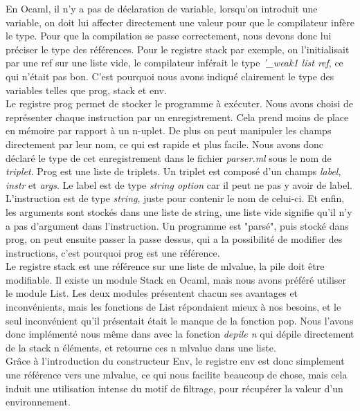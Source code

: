 \documentclass[11pt]{article}
\begin{document}
%

\vspace{0.5cm}

En Ocaml, il n'y a pas de déclaration de variable, lorsqu'on introduit une variable, on doit lui affecter directement une valeur pour que le compilateur infère le type. Pour que la compilation se passe correctement, nous devons donc lui préciser le type des références. Pour le registre stack par exemple, on l'initialisait par une ref sur une liste vide, le compilateur inférait le type {\em '\_weak1 list ref}, ce qui n'était pas bon. C'est pourquoi nous avons indiqué clairement le type des variables telles que prog, stack et env.\\

Le registre prog permet de stocker le programme à exécuter. Nous avons choisi de représenter chaque instruction par un enregistrement. Cela prend moins de place en mémoire par rapport à un n-uplet. De plus on peut manipuler les champs directement par leur nom, ce qui est rapide et plus facile. Nous avons donc déclaré le type de cet enregistrement dans le fichier {\em parser.ml} sous le nom de {\em triplet}. Prog est une liste de triplets. Un triplet est composé d'un champs {\em label}, {\em instr} et {\em args}. Le label est de type {\em string option} car il peut ne pas y avoir de label. L'instruction est de type {\em string}, juste pour contenir le nom de celui-ci. Et enfin, les arguments sont stockés dans une liste de string, une liste vide signifie qu'il n'y a pas d'argument dans l'instruction. Un programme est "parsé", puis stocké dans prog, on peut ensuite passer la passe dessus, qui a la possibilité de modifier des instructions, c'est pourquoi prog est une référence.\\

Le registre stack est une référence sur une liste de mlvalue, la pile doit être modifiable. Il existe un module Stack en Ocaml, mais nous avons préféré utiliser le module List. Les deux modules présentent chacun ses avantages et inconvénients, mais les fonctions de List répondaient mieux à nos besoins, et le seul inconvénient qu'il présentait était le manque de la fonction pop. Nous l'avons donc implémenté nous même dans avec la fonction {\em depile n} qui dépile directement de la stack n éléments, et retourne ces n mlvalue dans une liste.\\

Grâce à l'introduction du constructeur Env, le registre env est donc simplement une référence vers une mlvalue, ce qui nous facilite beaucoup de chose, mais cela induit une utilisation intense du motif de filtrage, pour récupérer la valeur d'un environnement.
\end{document}
